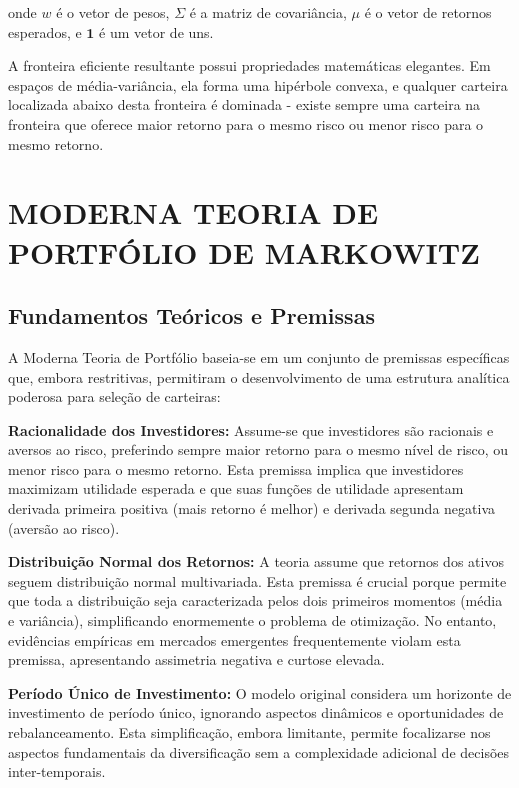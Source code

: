 onde $w$ é o vetor de pesos, $\Sigma$ é a matriz de covariância, $\mu$ é o vetor de retornos esperados, e $\mathbf{1}$ é um vetor de uns.

A fronteira eficiente resultante possui propriedades matemáticas elegantes. Em espaços de média-variância, ela forma uma hipérbole convexa, e qualquer carteira localizada abaixo desta fronteira é dominada - existe sempre uma carteira na fronteira que oferece maior retorno para o mesmo risco ou menor risco para o mesmo retorno.

\section{MODERNA TEORIA DE PORTFÓLIO DE MARKOWITZ}

\subsection{Fundamentos Teóricos e Premissas}

A Moderna Teoria de Portfólio baseia-se em um conjunto de premissas específicas que, embora restritivas, permitiram o desenvolvimento de uma estrutura analítica poderosa para seleção de carteiras:

\textbf{Racionalidade dos Investidores:} Assume-se que investidores são racionais e aversos ao risco, preferindo sempre maior retorno para o mesmo nível de risco, ou menor risco para o mesmo retorno. Esta premissa implica que investidores maximizam utilidade esperada e que suas funções de utilidade apresentam derivada primeira positiva (mais retorno é melhor) e derivada segunda negativa (aversão ao risco).

\textbf{Distribuição Normal dos Retornos:} A teoria assume que retornos dos ativos seguem distribuição normal multivariada. Esta premissa é crucial porque permite que toda a distribuição seja caracterizada pelos dois primeiros momentos (média e variância), simplificando enormemente o problema de otimização. No entanto, evidências empíricas em mercados emergentes frequentemente violam esta premissa, apresentando assimetria negativa e curtose elevada.

\textbf{Período Único de Investimento:} O modelo original considera um horizonte de investimento de período único, ignorando aspectos dinâmicos e oportunidades de rebalanceamento. Esta simplificação, embora limitante, permite focalizarse nos aspectos fundamentais da diversificação sem a complexidade adicional de decisões inter-temporais.

